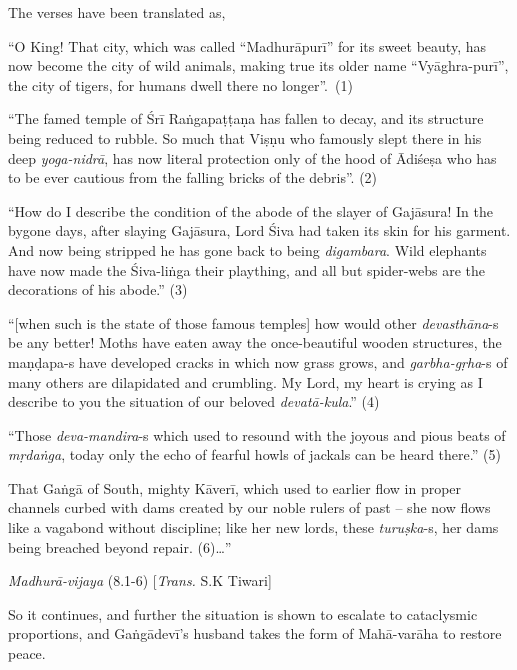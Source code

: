 The verses have been translated as, 

\begin{myquote}
“O King! That city, which was called “Madhurāpurī” for its sweet beauty, has now become the city of wild animals, making true its older name “Vyāghra-purī”, the city of tigers, for humans dwell there no longer”.~(1) 

“The famed temple of Śrī Raṅgapaṭṭaṇa has fallen to decay, and its structure being reduced to rubble. So much that Viṣṇu who famously slept there in his deep {\sl yoga-nidrā}, has now literal protection only of the hood of Ādiśeṣa who has to be ever cautious from the falling bricks of the debris”. (2) 

“How do I describe the condition of the abode of the slayer of Gajāsura! In the bygone days, after slaying Gajāsura, Lord Śiva had taken its skin for his garment. And now being stripped he has gone back to being {\sl digambara}. Wild elephants have now made the Śiva-liṅga their plaything, and all but spider-webs are the decorations of his abode.” (3) 

“[when such is the state of those famous temples] how would other {\sl devasthāna}-s be any better! Moths have eaten away the once-beautiful wooden structures, the maṇḍapa-s have developed cracks in which now grass grows, and {\sl garbha-gṛha}-s of many others are dilapidated and crumbling. My Lord, my heart is crying as I describe to you the situation of our beloved {\sl devatā-kula}.” (4) 

“Those {\sl deva-mandira}-s which used to resound with the joyous and pious beats of {\sl mṛdaṅga}, today only the echo of fearful howls of jackals can be heard there.” (5) 

That Gaṅgā of South, mighty Kāverī, which used to earlier flow in proper channels curbed with dams created by our noble rulers of past – she now flows like a vagabond without discipline; like her new lords, these {\sl turuṣka}-s, her dams being breached beyond repair. (6)…” 

\hfill {\sl Madhurā-vijaya} (8.1-6) [{\sl Trans.} S.K  Tiwari]
\end{myquote}

So it continues, and further the situation is shown to escalate to cataclysmic proportions, and Gaṅgādevī’s husband takes the form of Mahā-varāha to restore peace. 

